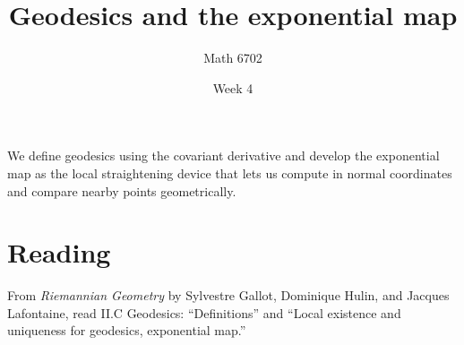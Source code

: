 \documentclass{article}
\title{Geodesics and the exponential map}
\author{Math 6702}
\date{Week 4}
\begin{document}
\maketitle

We define geodesics using the covariant derivative and develop the exponential map as the local straightening device that lets us compute in normal coordinates and compare nearby points geometrically.

\section*{Reading}
From \textit{Riemannian Geometry} by Sylvestre Gallot, Dominique Hulin, and Jacques Lafontaine, read \textsection II.C Geodesics: ``Definitions'' and ``Local existence and uniqueness for geodesics, exponential map.''
\end{document}
